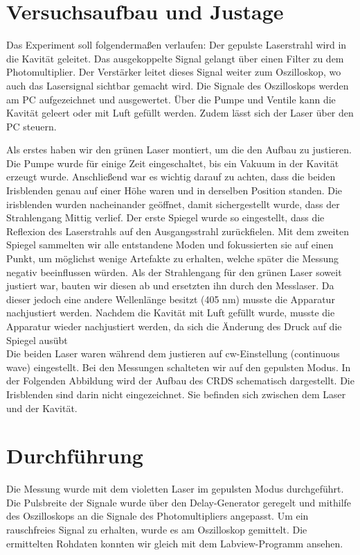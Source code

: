 \section{Versuchsaufbau und Justage}

Das Experiment soll folgendermaßen verlaufen: Der gepulste Laserstrahl wird in die Kavität geleitet. Das ausgekoppelte Signal gelangt über einen Filter zu dem Photomultiplier. Der Verstärker leitet dieses Signal weiter zum Oszilloskop, wo auch das Lasersignal sichtbar gemacht wird. Die Signale des Oszilloskops werden am PC aufgezeichnet und ausgewertet. Über die Pumpe und Ventile kann die Kavität geleert oder mit Luft gefüllt werden. Zudem lässt sich der Laser über den PC steuern.

Als erstes haben wir den grünen Laser montiert, um die den Aufbau zu justieren. Die Pumpe wurde für einige Zeit eingeschaltet, bis ein Vakuum in der Kavität erzeugt wurde. Anschließend war es wichtig darauf zu achten, dass die beiden Irisblenden genau auf einer Höhe waren und in derselben Position standen. Die irisblenden wurden nacheinander geöffnet, damit sichergestellt wurde, dass der Strahlengang Mittig verlief. Der erste Spiegel wurde so eingestellt, dass die Reflexion des Laserstrahls auf den Ausgangsstrahl zurückfielen. Mit dem zweiten Spiegel sammelten wir alle entstandene Moden und fokussierten sie auf einen Punkt, um möglichst wenige Artefakte zu erhalten, welche später die Messung negativ beeinflussen würden. Als der Strahlengang für den grünen Laser soweit justiert war, bauten wir diesen ab und ersetzten ihn durch den Messlaser. Da dieser jedoch eine andere Wellenlänge besitzt (405 nm) musste die Apparatur nachjustiert werden. Nachdem die Kavität mit Luft gefüllt wurde, musste die Apparatur wieder nachjustiert werden, da sich die Änderung des Druck auf die Spiegel ausübt\\
Die beiden Laser waren während dem justieren auf cw-Einstellung (continuous wave) eingestellt. Bei den Messungen schalteten wir auf den gepulsten Modus. In der Folgenden Abbildung wird der Aufbau des CRDS schematisch dargestellt. Die Irisblenden sind darin nicht eingezeichnet. Sie befinden sich zwischen dem Laser und der Kavität.



\section{Durchführung}
Die Messung wurde mit dem violetten Laser im gepulsten Modus durchgeführt. Die Pulsbreite der Signale wurde über den Delay-Generator geregelt und mithilfe des Oszilloskops an die Signale des Photomultipliers angepasst. Um ein rauschfreies Signal zu erhalten, wurde es am Oszilloskop gemittelt. Die ermittelten Rohdaten konnten wir gleich mit dem Labview-Programm ansehen. 

